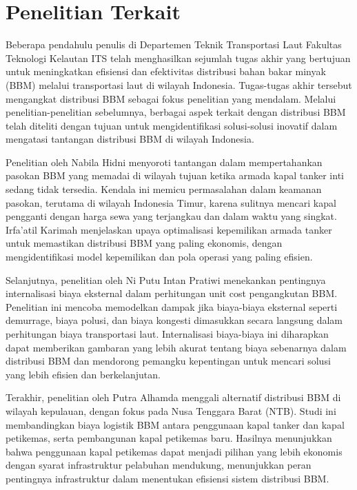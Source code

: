 \section{Penelitian Terkait}
\label{sec:penelitian-terkait}
Beberapa pendahulu penulis di Departemen Teknik Transportasi Laut Fakultas Teknologi Kelautan ITS telah menghasilkan sejumlah tugas akhir yang bertujuan untuk meningkatkan efisiensi dan efektivitas distribusi bahan bakar minyak (BBM) melalui transportasi laut di wilayah Indonesia. Tugas-tugas akhir tersebut mengangkat distribusi BBM sebagai fokus penelitian yang mendalam. Melalui penelitian-penelitian sebelumnya, berbagai aspek terkait dengan distribusi BBM telah diteliti dengan tujuan untuk mengidentifikasi solusi-solusi inovatif dalam mengatasi tantangan distribusi BBM di wilayah Indonesia.
    
    Penelitian oleh Nabila Hidni \citep{Hidni2016Model} menyoroti tantangan dalam mempertahankan pasokan BBM yang memadai di wilayah tujuan ketika armada kapal tanker inti sedang tidak tersedia. Kendala ini memicu permasalahan dalam keamanan pasokan, terutama di wilayah Indonesia Timur, karena sulitnya mencari kapal pengganti dengan harga sewa yang terjangkau dan dalam waktu yang singkat. Irfa'atil Karimah \citep{Karimah2016Optimalisasi} menjelaskan upaya optimalisasi kepemilikan armada tanker untuk memastikan distribusi BBM yang paling ekonomis, dengan mengidentifikasi model kepemilikan dan pola operasi yang paling efisien.

    Selanjutnya, penelitian oleh Ni Putu Intan Pratiwi \citep{Pratiwi2013Internalisasi} menekankan pentingnya internalisasi biaya eksternal dalam perhitungan unit cost pengangkutan BBM. Penelitian ini mencoba memodelkan dampak jika biaya-biaya eksternal seperti demurrage, biaya polusi, dan biaya kongesti dimasukkan secara langsung dalam perhitungan biaya transportasi laut. Internalisasi biaya-biaya ini diharapkan dapat memberikan gambaran yang lebih akurat tentang biaya sebenarnya dalam distribusi BBM dan mendorong pemangku kepentingan untuk mencari solusi yang lebih efisien dan berkelanjutan.
    
    Terakhir, penelitian oleh Putra Alhamda \citep{Alhamda2016Optimalisasi} menggali alternatif distribusi BBM di wilayah kepulauan, dengan fokus pada Nusa Tenggara Barat (NTB). Studi ini membandingkan biaya logistik BBM antara penggunaan kapal tanker dan kapal petikemas, serta pembangunan kapal petikemas baru. Hasilnya menunjukkan bahwa penggunaan kapal petikemas dapat menjadi pilihan yang lebih ekonomis dengan syarat infrastruktur pelabuhan mendukung, menunjukkan peran pentingnya infrastruktur dalam menentukan efisiensi sistem distribusi BBM.



